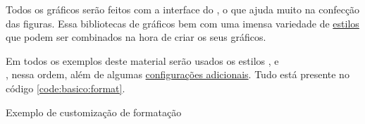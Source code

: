 Todos os gráficos serão feitos com a interface \pyplot do \matplotlib, o que ajuda muito na confecção das figuras. Essa bibliotecas de gráficos bem com uma imensa variedade de \href{https://matplotlib.org/3.1.0/gallery/style_sheets/style_sheets_reference.html}{estilos} que podem ser combinados na hora de criar os seus gráficos.

Em todos os exemplos deste material serão usados os estilos ,  e \\, nessa ordem, além de algumas \href{https://matplotlib.org/users/customizing.html}{configurações adicionais}. Tudo está presente no código \ref{code:basico:format}.

\begin{listing}[H]
    \caption{Exemplo de customização de formatação}
    \label{code:basico:format}

\end{listing}
